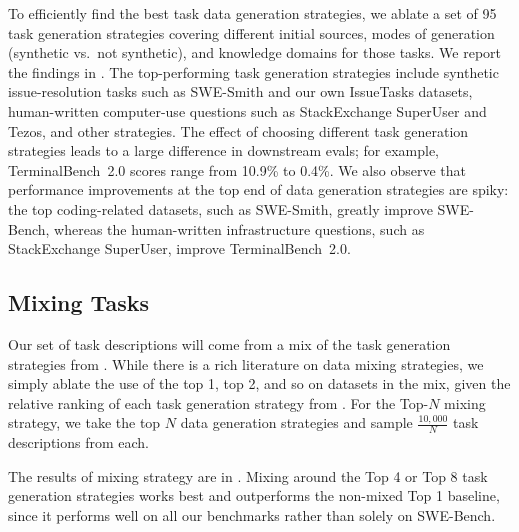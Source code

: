 \documentclass{article}
\begin{document}
To efficiently find the best task data generation strategies, we ablate a set of 95 task generation strategies covering different initial sources, modes of generation (synthetic vs.\ not synthetic), and knowledge domains for those tasks. We report the findings in . The top-performing task generation strategies include synthetic issue-resolution tasks such as SWE-Smith and our own IssueTasks datasets, human-written computer-use questions such as StackExchange SuperUser and Tezos, and other strategies. The effect of choosing different task generation strategies leads to a large difference in downstream evals; for example, TerminalBench~2.0 scores range from 10.9\% to 0.4\%. We also observe that performance improvements at the top end of data generation strategies are spiky: the top coding-related datasets, such as SWE-Smith, greatly improve SWE-Bench, whereas the human-written infrastructure questions, such as StackExchange SuperUser, improve TerminalBench~2.0.

\subsection{Mixing Tasks}
\label{sec:mixing_tasks}

Our set of task descriptions will come from a mix of the task generation strategies from . While there is a rich literature on data mixing strategies, we simply ablate the use of the top 1, top 2, and so on datasets in the mix, given the relative ranking of each task generation strategy from . For the Top-$N$ mixing strategy, we take the top $N$ data generation strategies and sample $\frac{10{,}000}{N}$ task descriptions from each.

The results of mixing strategy are in . Mixing around the Top 4 or Top 8 task generation strategies works best and outperforms the non-mixed Top 1 baseline, since it performs well on all our benchmarks rather than solely on SWE-Bench.
\end{document}
